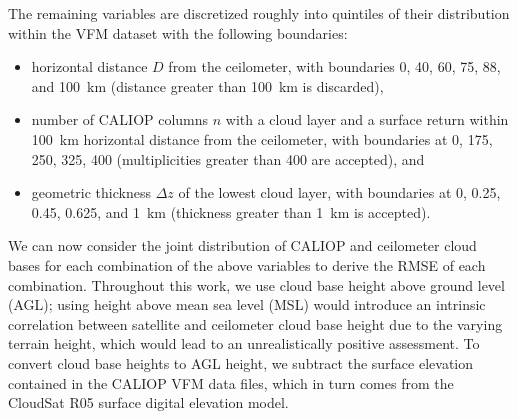 \documentclass[essd,manuscript]{copernicus}\usepackage[]{graphicx}\usepackage[]{color}
\begin{document}
The remaining variables are discretized roughly into quintiles of their
distribution within the VFM dataset with the
following boundaries:
\begin{itemize}
\item horizontal distance $D$ from the ceilometer, with boundaries 0, 40, 60,
  75, 88, and 100~km (distance greater than 100~km is discarded),
\item number of CALIOP columns $n$ with a cloud layer and a surface return
  within 100~km horizontal distance from the ceilometer, with boundaries at 0,
  175, 250, 325, 400 (multiplicities greater than 400 are accepted), and
\item geometric thickness $\Delta z$ of the lowest cloud layer, with boundaries
  at 0, 0.25, 0.45, 0.625, and 1~km (thickness greater than 1~km is accepted).
\end{itemize}

We can now consider the joint distribution of CALIOP and ceilometer cloud bases
for each combination of the above variables to derive the RMSE of each
combination.  Throughout this work, we use cloud base height above ground level
(AGL); using height above mean sea level (MSL) would introduce an intrinsic
correlation between satellite and ceilometer cloud base height due to the
varying terrain height, which would lead to an unrealistically positive
assessment.  To convert cloud base heights to AGL height, we subtract the
surface elevation contained in the CALIOP VFM data files, which in turn comes
from the CloudSat R05 surface digital elevation model. 
\end{document}
